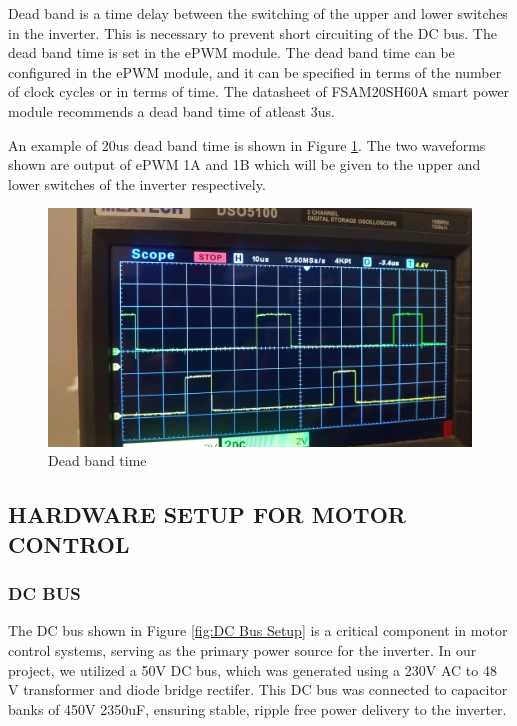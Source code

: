 Dead band is a time delay between the switching of the upper and lower switches in the inverter. This is necessary to prevent short circuiting of the DC bus. The dead band time is set in the ePWM module. The dead band time can be configured in the ePWM module, and it can be specified in terms of the number of clock cycles or in terms of time. The datasheet of FSAM20SH60A smart power module recommends a dead band time of atleast 3us.


\vspace{0.2in}

An example of 20us dead band time is shown in Figure \ref{fig:deadBand}. The two waveforms shown are output of ePWM 1A and 1B which will be given to the upper and lower switches of the inverter respectively.

\begin{figure}
	\centering
	\includegraphics[width=6in]{sections/section6/images/SVPWM/DeadBand20Us.jpeg}
	\caption{Dead band time}
	\label{fig:deadBand}
\end{figure}


\subsection{HARDWARE SETUP FOR MOTOR CONTROL}

\subsubsection{DC BUS}

The DC bus shown in Figure \ref{fig:DC Bus Setup} is a critical component in motor control systems, serving as the primary power source for the inverter. In our project, we utilized a 50V DC bus, which was generated using a 230V AC to 48 V transformer and diode bridge rectifer. This DC bus was connected to capacitor banks of 450V 2350uF, ensuring stable, ripple free power delivery to the inverter.


